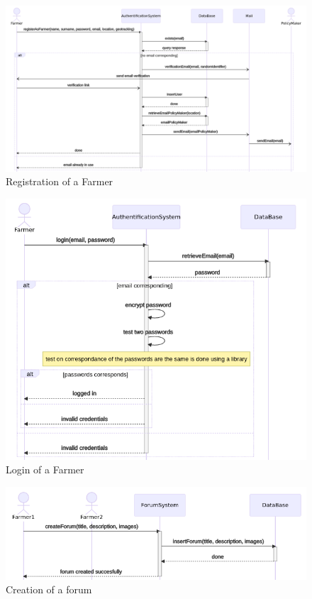 \begin{figure} [!h]
	\centering
	\includegraphics[width=\textwidth]{Images/seq_registration.png}
	\caption{\label{fig:seq_registration} Registration of a Farmer}
\end{figure}

\begin{figure} [!h]
	\centering
	\includegraphics[width=\textwidth]{Images/seq_login.png}
	\caption{\label{fig:seq_login} Login of a Farmer}
\end{figure}

\begin{figure} [!h]
	\centering
	\includegraphics[width=\textwidth]{Images/seq_forum_creation.png}
	\caption{\label{fig:seq_crea_forum} Creation of a forum}
\end{figure}
